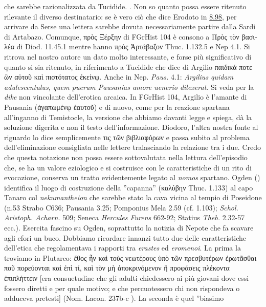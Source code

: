 {            che sarebbe razionalizzata da Tucidide. \cite[264]{CulassoGastaldi1990}. Non so quanto possa essere ritenuto rilevante il diverso destinatario: se è vero ciò che dice Erodoto in \href{http://data.perseus.org/citations/urn:cts:greekLit:tlg0016.tlg001.perseus-grc1:8.98}{8.98}, per arrivare da Serse una lettera sarebbe dovuta necessariamente partire dalla Sardi di Artabazo. Comunque, \textgreek{πρὸς Ξέρξην} di FGrHist 104 è consono a \textgreek{Πρὸς τὸν βασιλέα} di Diod. 11.45.1 mentre hanno \textgreek{πρὸς Ἀρτάβαζον} Thuc. 1.132.5 e Nep 4.1. Si ritrova nel nostro autore un dato molto interessante, e forse più significativo di quanto si sia ritenuto, in riferimento a Tucidide che dice di Argilio  \textgreek{παιδικά ποτε ὢν αὐτοῦ καὶ πιστότατος ἐκείνῳ}. Anche in Nep. \emph{Paus.} 4.1:\emph{ Argilius quidam adulescentulus, quem puerum Pausanias amore uenerio dilexerat}. Si veda \cite[128]{Vattuone2004a} per la \emph{dike} non vincolante dell'erotica arcaica.  In FGrHist 104, Argilio  è l'amante di Pausania  (\textgreek{ἀγαπωμένῳ ἑαυτοῦ}) e di nuovo, come per la reazione spartana all'inganno di Temistocle, la versione che abbiamo davanti legge e spiega, dà la soluzione digerita e non il testo dell'informazione. Diodoro, l'altra nostra fonte al riguardo lo dice semplicemente \textgreek{τις τῶν βιβλιαφόρων} e passa subito al problema dell'eliminazione consigliata nelle lettere tralasciando la relazione tra i due. Credo che questa notazione non possa essere sottovalutata nella lettura dell'episodio che, se ha un valore eziologico e si costruisce con le caratteristiche di un rito di evocazione, conserva un tratto evidentemente legato al \emph{nomos} spartano. Ogden (\cite*[123]{Ogden2002}) identifica il luogo di costruzione della ''capanna'' (\textgreek{καλύβην} Thuc. 1.133) al capo Tanaro col \emph{nekumantheion} che sarebbe stato la cava vicina al tempio di Poseidone (n.53 Strabo C636; Pausania 3.25; Pomponius Mela 2.59 (cf. 1.103); \emph{Schol. Aristoph. Acharn.} 509; Seneca \emph{Hercules Furens} 662-92; Statius \emph{Theb.} 2.32-57 ecc.). Esercita fascino su Ogden, soprattutto la notizia di  Nepote che fa scavare agli efori un buco. Dobbiamo ricordare innanzi tutto due delle caratteristiche dell'etica che regolamentava i rapporti tra \emph{erastes} ed \emph{eromenoi}. La prima la troviamo in Plutarco: \textgreek{ἔθος ἦν καὶ τοὺς νεωτέρους ὑπὸ τῶν πρεσβυτέρων ἐρωτᾶσθαι ποῦ πορεύονται καὶ ἐπὶ τί, καὶ τὸν μὴ ἀποκρινόμενον ἢ προφάσεις πλέκοντα ἐπιπλήττειν} [era consuetudine che gli adulti chiedessero ai più giovani dove essi fossero diretti e per quale motivo; e che percuotessero chi non rispondeva o adduceva pretesti] (Nom. Lacon. 237b-c \label{bkm:plutnomlacon237bc79}). La seconda è quel ''biasimo }
